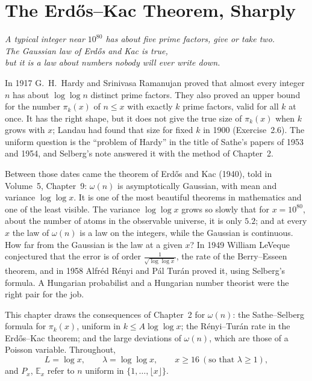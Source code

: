 \chapter{The Erd\H{o}s--Kac Theorem, Sharply}\label{ch:erdoskac}
\begin{center}\itshape
A typical integer near $10^{80}$ has about five prime factors, give or take two.\\
The Gaussian law of Erd\H{o}s and Kac is true,\\
but it is a law about numbers nobody will ever write down.
\end{center}

In 1917 G.~H.~Hardy and Srinivasa Ramanujan proved that almost every integer $n$ has about $\log\log n$ distinct prime factors. They also proved an upper bound for the number $\pi_k(x)$ of $n\le x$ with exactly $k$ prime factors, valid for all $k$ at once. It has the right shape, but it does not give the true size of $\pi_k(x)$ when $k$ grows with $x$; Landau had found that size for fixed $k$ in 1900 (Exercise~2.6). The uniform question is the ``problem of Hardy'' in the title of Sathe's papers of 1953 and 1954, and Selberg's note answered it with the method of Chapter~2.

Between those dates came the theorem of Erd\H{o}s and Kac (1940), told in Volume~5, Chapter~9: $\omega(n)$ is asymptotically Gaussian, with mean and variance $\log\log x$. It is one of the most beautiful theorems in mathematics and one of the least visible. The variance $\log\log x$ grows so slowly that for $x=10^{80}$, about the number of atoms in the observable universe, it is only $5.2$; and at every $x$ the law of $\omega(n)$ is a law on the integers, while the Gaussian is continuous. How far from the Gaussian is the law at a given $x$? In 1949 William LeVeque conjectured that the error is of order $\frac1{\sqrt{\log\log x}}$, the rate of the Berry--Esseen theorem, and in 1958 Alfréd Rényi and Pál Turán proved it, using Selberg's formula. A Hungarian probabilist and a Hungarian number theorist were the right pair for the job.

This chapter draws the consequences of Chapter~2 for $\omega(n)$: the Sathe--Selberg formula for $\pi_k(x)$, uniform in $k\le A\log\log x$; the Rényi--Turán rate in the Erd\H{o}s--Kac theorem; and the large deviations of $\omega(n)$, which are those of a Poisson variable. Throughout,
\[
L=\log x,\qquad\lambda=\log\log x,\qquad x\ge16\ (\text{so that }\lambda\ge1),
\]
and $P_x$, $\mathbb E_x$ refer to $n$ uniform in $\{1,\dots,\lfloor x\rfloor\}$.

